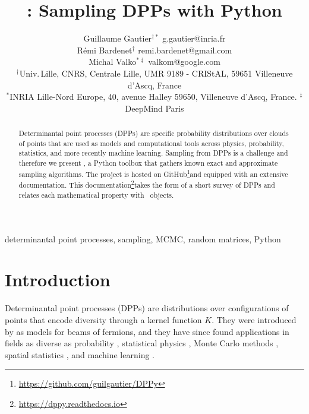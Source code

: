 \documentclass[twoside,11pt]{article}
\begin{document}
\title{\DPPy: Sampling DPPs with Python}

\author{\name Guillaume Gautier$^{\dagger*}$ \email g.gautier@inria.fr \\
       \name R\'emi Bardenet$^\dagger$ \email remi.bardenet@gmail.com \\
       \name Michal Valko$^{*\ddag}$ \email valkom@google.com\\
       \addr $^\dagger$Univ.\,Lille, CNRS, Centrale Lille, UMR 9189 - CRIStAL, 59651 Villeneuve d'Ascq, France\\
       \addr $^*$INRIA Lille-Nord Europe, 40, avenue Halley 59650, Villeneuve d'Ascq, France. \addr $^\ddag$DeepMind Paris
}

\editor{}

\maketitle

\setcounter{footnote}{3}
\begin{abstract}%
  Determinantal point processes (DPPs) are specific probability distributions over clouds of points that are used as models and computational tools across physics, probability, statistics, and more recently machine learning.
  Sampling from DPPs is a challenge and therefore we present \DPPy, a Python toolbox that gathers known exact and approximate sampling algorithms.
  The project is hosted on GitHub\!\footnote{\label{fn:github}\url{https://github.com/guilgautier/DPPy}}and equipped with an extensive documentation.
  This documentation\!\footnote{\label{fn:docs}\url{https://dppy.readthedocs.io}}takes the form of a short survey of DPPs and relates each mathematical property with \DPPy\ objects.
\end{abstract}

\begin{keywords}%
    determinantal point processes,
    sampling,
    MCMC,
    random matrices,
    Python
\end{keywords}

\section{Introduction} %
\label{sec:introduction}

    Determinantal point processes (DPPs) are distributions over configurations of points that encode diversity through a kernel function $K$.
    They were introduced by \citet{Mac75} as models for beams of fermions, and they have since found applications in fields as diverse as probability \citep{Sos00, Kon05, HKPV06}, statistical physics \citep{PaBe11}, Monte Carlo methods \citep{BaHa16}, spatial statistics \citep{LaMoRu15}, and machine learning \citep[ML,][]{KuTa12}.
\end{document}
